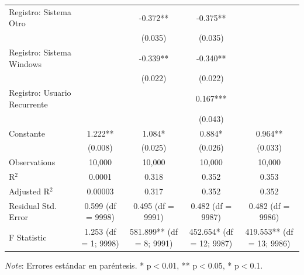 \documentclass[conference]{IEEEtran}
\begin{document}
\begin{table}[H]
\begin{threeparttable}
\begin{tabular}{lcccc}
Registro: Sistema Otro      &         & -0.372** & -0.375** \\
                            &         & (0.035) & (0.035) \\
Registro: Sistema Windows   &         & -0.339** & -0.340** \\
                            &         & (0.022) & (0.022) \\
Registro: Usuario Recurrente &        &         & 0.167*** \\
                            &         &         & (0.043) \\
Constante                   & 1.222** & 1.084* & 0.884* & 0.964** \\
                            & (0.008) & (0.025) & (0.026) & (0.033) \\
\midrule
Observations                & 10,000 & 10,000 & 10,000 & 10,000 \\
R$^{2}$                     & 0.0001 & 0.318 & 0.352 & 0.353 \\
Adjusted R$^{2}$            & 0.00003 & 0.317 & 0.352 & 0.352 \\
Residual Std. Error         & 0.599 (df = 9998) & 0.495 (df = 9991) & 0.482 (df = 9987) & 0.482 (df = 9986) \\
F Statistic                 & 1.253 (df = 1; 9998) & 581.899** (df = 8; 9991) & 452.654* (df = 12; 9987) & 419.553** (df = 13; 9986) \\
\bottomrule
\end{tabular}
\begin{tablenotes}
\small
\item \textit{Note}: Errores estándar en paréntesis. * p$<$0.01, ** p$<$0.05, * p$<$0.1.
\end{tablenotes}
\end{threeparttable}
\end{table}
\end{document}
